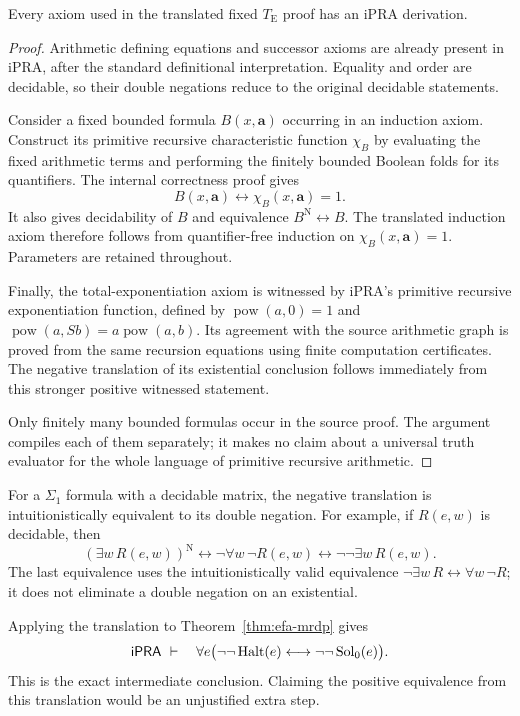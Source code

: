 \begin{lemma}
Every axiom used in the translated fixed $T_{\mathrm E}$ proof has an iPRA
derivation.
\end{lemma}
\begin{proof}
Arithmetic defining equations and successor axioms are already present
in iPRA, after the standard definitional interpretation. Equality and
order are decidable, so their double negations reduce to the original
decidable statements.

Consider a fixed bounded formula $B(x,\boldsymbol a)$ occurring in an
induction axiom. Construct its primitive recursive characteristic
function $\chi_B$ by evaluating the fixed arithmetic terms and performing
the finitely bounded Boolean folds for its quantifiers. The internal
correctness proof gives
\[
 B(x,\boldsymbol a)\longleftrightarrow\chi_B(x,\boldsymbol a)=1.
\]
It also gives decidability of $B$ and equivalence
$B^{\mathrm N}\leftrightarrow B$. The translated induction axiom therefore
follows from quantifier-free induction on
$\chi_B(x,\boldsymbol a)=1$. Parameters are retained throughout.

Finally, the total-exponentiation axiom is witnessed by iPRA's primitive
recursive exponentiation function, defined by
$\operatorname{pow}(a,0)=1$ and
$\operatorname{pow}(a,Sb)=a\operatorname{pow}(a,b)$. Its agreement with the
source arithmetic graph is proved from the same recursion equations
using finite computation certificates. The negative translation of its
existential conclusion follows immediately from this stronger positive
witnessed statement.

Only finitely many bounded formulas occur in the source proof. The argument
compiles each of them separately; it makes no claim about a universal
truth evaluator for the whole language of primitive recursive arithmetic.
\end{proof}

For a $\Sigma_1$ formula with a decidable matrix, the negative translation
is intuitionistically equivalent to its double negation. For example,
if $R(e,w)$ is decidable, then
\[
 (\exists w\,R(e,w))^{\mathrm N}
 \longleftrightarrow\neg\forall w\,\neg R(e,w)
 \longleftrightarrow\neg\neg\exists w\,R(e,w).
\]
The last equivalence uses the intuitionistically valid equivalence
$\neg\exists w\,R\leftrightarrow\forall w\,\neg R$; it does not eliminate
a double negation on an existential.

Applying the translation to Theorem~\ref{thm:efa-mrdp} gives
\begin{equation}\label{eq:nn-mrdp}
 \mathsf{iPRA}\ \vdash\quad
 \forall e\bigl(\neg\neg\operatorname{Halt}(e)
                \longleftrightarrow\neg\neg\operatorname{Sol}_0(e)\bigr).
\end{equation}
This is the exact intermediate conclusion. Claiming the positive
equivalence from this translation would be an unjustified extra step.

